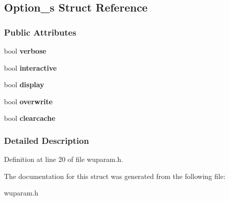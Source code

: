 \hypertarget{structOption__s}{
\subsection{Option\_\-s Struct Reference}
\label{structOption__s}
}
\subsubsection*{Public Attributes}
\begin{DoxyCompactItemize}
\item 
\hypertarget{structOption__s_a09d8a06dd676f09df38bcdd27b7d7fbe}{
bool {\bfseries verbose}}
\label{structOption__s_a09d8a06dd676f09df38bcdd27b7d7fbe}

\item 
\hypertarget{structOption__s_a47776a1c608f1bd214d53118a3710453}{
bool {\bfseries interactive}}
\label{structOption__s_a47776a1c608f1bd214d53118a3710453}

\item 
\hypertarget{structOption__s_aa34cf8e9d474d35d4ee08ba63c49d49b}{
bool {\bfseries display}}
\label{structOption__s_aa34cf8e9d474d35d4ee08ba63c49d49b}

\item 
\hypertarget{structOption__s_a66d749f5a5f87341a44fad6bc4c04a44}{
bool {\bfseries overwrite}}
\label{structOption__s_a66d749f5a5f87341a44fad6bc4c04a44}

\item 
\hypertarget{structOption__s_a607ba585080fc346d78962c37b37c2dc}{
bool {\bfseries clearcache}}
\label{structOption__s_a607ba585080fc346d78962c37b37c2dc}

\end{DoxyCompactItemize}


\subsubsection{Detailed Description}


Definition at line 20 of file wuparam.h.



The documentation for this struct was generated from the following file:\begin{DoxyCompactItemize}
\item 
wuparam.h\end{DoxyCompactItemize}
